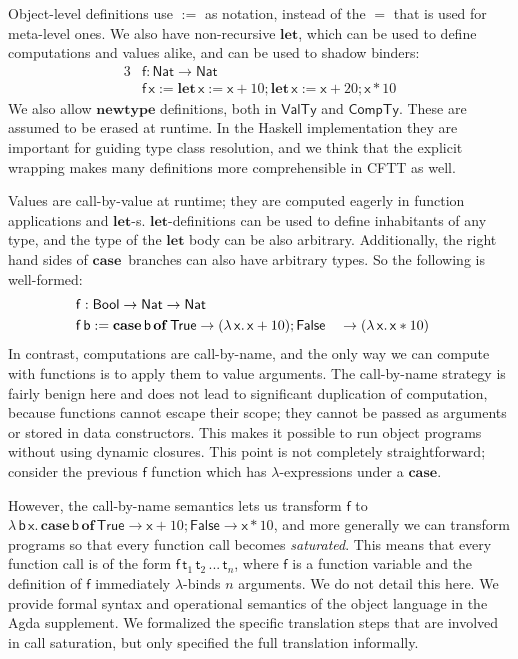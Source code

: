 \documentclass[acmsmall,screen,review,anonymous]{acmart}
\newcommand{\msf}[1]{{\mathsf{#1}}}
\newcommand{\mbf}[1]{{\mathbf{#1}}}
\newcommand{\lam}{\lambda\,}
\newcommand{\of}{\mbf{of}\,}
\newcommand{\letdef}{\mbf{let\,}}
\newcommand{\vb}{\mathsf{b}}
\newcommand{\vx}{\mathsf{x}}
\newcommand{\vf}{\mathsf{f}}
\newcommand{\vt}{\mathsf{t}}
\newcommand{\Bool}{\msf{Bool}}
\newcommand{\case}{\mbf{case\,}}
\newcommand{\VTy}{\msf{ValTy}}
\newcommand{\CTy}{\msf{CompTy}}
\newcommand{\True}{\msf{True}}
\newcommand{\False}{\msf{False}}
\newcommand{\Nat}{\msf{Nat}}
\theoremstyle{remark}
\begin{document}
Object-level definitions use $:=$ as notation, instead of the $=$ that is used
for meta-level ones. We also have non-recursive $\mbf{let}$, which can be used
to define computations and values alike, and can be used to shadow binders:
\begin{alignat*}{3}
  &\vf : \Nat \to \Nat\\
  &\vf\,\vx := \letdef \vx := \vx + 10; \letdef \vx := \vx + 20; \vx * 10
\end{alignat*}
We also allow $\mbf{newtype}$ definitions, both in $\VTy$ and $\CTy$. These are
assumed to be erased at runtime. In the Haskell implementation they are
important for guiding type class resolution, and we think that the explicit
wrapping makes many definitions more comprehensible in CFTT as well.

Values are call-by-value at runtime; they are computed eagerly in function
applications and $\mbf{let}$-s. $\mbf{let}$-definitions can be used to define
inhabitants of any type, and the type of the $\mbf{let}$ body can be also
arbitrary. Additionally, the right hand sides of $\case$ branches can also have
arbitrary types. So the following is well-formed:
\begin{alignat*}{3}
  &\vf : \mathrlap{\Bool \to \Nat \to \Nat}\\
  &\vf\,\vb := \case \vb\,\of \True \to (\lam \vx.\, \vx + 10); \False &&\to (\lam \vx.\, \vx * 10)
\end{alignat*}
In contrast, computations are call-by-name, and the only way we can compute with
functions is to apply them to value arguments. The call-by-name strategy is
fairly benign here and does not lead to significant duplication of computation,
because functions cannot escape their scope; they cannot be passed as arguments
or stored in data constructors. This makes it possible to run object programs
without using dynamic closures. This point is not completely straightforward;
consider the previous $\vf$ function which has $\lambda$-expressions under a
$\mbf{case}$.

However, the call-by-name semantics lets us transform $\vf$ to $\lam
\vb\,\vx.\,\case \vb\,\of \True \to \vx + 10; \False \to \vx * 10$, and more
generally we can transform programs so that every function call becomes
\emph{saturated}. This means that every function call is of the form
$\vf\,\vt_1\,\vt_2\,...\,\vt_n$, where $\vf$ is a function variable and the
definition of $\vf$ immediately $\lambda$-binds $n$ arguments. We do not detail
this here. We provide formal syntax and operational semantics of the object
language in the Agda supplement. We formalized the specific translation steps
that are involved in call saturation, but only specified the full translation
informally.
\end{document}
